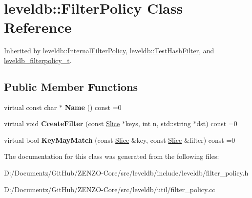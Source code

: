 \hypertarget{classleveldb_1_1_filter_policy}{}\section{leveldb\+::Filter\+Policy Class Reference}
\label{classleveldb_1_1_filter_policy}


Inherited by \mbox{\hyperlink{classleveldb_1_1_internal_filter_policy}{leveldb\+::\+Internal\+Filter\+Policy}}, \mbox{\hyperlink{classleveldb_1_1_test_hash_filter}{leveldb\+::\+Test\+Hash\+Filter}}, and \mbox{\hyperlink{structleveldb__filterpolicy__t}{leveldb\+\_\+filterpolicy\+\_\+t}}.

\subsection*{Public Member Functions}
\begin{DoxyCompactItemize}
\item 
\mbox{\label{classleveldb_1_1_filter_policy_afd5e951892a2e740f186c0658913ea1b}} 
virtual const char $\ast$ {\bfseries Name} () const =0
\item 
\mbox{\label{classleveldb_1_1_filter_policy_a355e9797e16dd16b93d19056781126b2}} 
virtual void {\bfseries Create\+Filter} (const \mbox{\hyperlink{classleveldb_1_1_slice}{Slice}} $\ast$keys, int n, std\+::string $\ast$dst) const =0
\item 
\mbox{\label{classleveldb_1_1_filter_policy_a6f8ba10ea25e0b4b8d0a6607c361c718}} 
virtual bool {\bfseries Key\+May\+Match} (const \mbox{\hyperlink{classleveldb_1_1_slice}{Slice}} \&key, const \mbox{\hyperlink{classleveldb_1_1_slice}{Slice}} \&filter) const =0
\end{DoxyCompactItemize}


The documentation for this class was generated from the following files\+:\begin{DoxyCompactItemize}
\item 
D\+:/\+Documentz/\+Git\+Hub/\+Z\+E\+N\+Z\+O-\/\+Core/src/leveldb/include/leveldb/filter\+\_\+policy.\+h\item 
D\+:/\+Documentz/\+Git\+Hub/\+Z\+E\+N\+Z\+O-\/\+Core/src/leveldb/util/filter\+\_\+policy.\+cc\end{DoxyCompactItemize}
